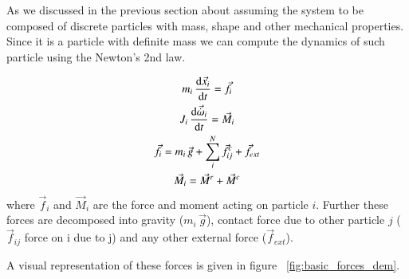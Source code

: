 As we discussed in the previous section about assuming the system to be composed
of discrete particles with mass, shape and other mechanical properties. Since it
is a particle with definite mass we can compute the dynamics of such particle
using the Newton's 2nd law.


\begin{gather}
  \label{eq:dem:equations_of_motion}
  m_i \, \dv{\vec{x}_i}{t} = \vec{f}_i\\
  J_i \, \dv{\vec{\dot{\omega}}_i}{t} = \vec{M}_i\\
  \vec{f}_i = m_i \,\vec{g} + \sum_i^N \vec{f}_{ij}^c + \vec{f}_{ext}\\
  \vec{M}_i = \vec{M}^r + \vec{M}^c
\end{gather}
where $\vec{f}_i$ and $\vec{M}_i$ are the force and moment acting on particle
$i$. Further these forces are decomposed into gravity ($m_i \, \vec{g}$),
contact force due to other particle $j$ ($\vec{f}_{ij}$ force on i due to j) and
any other external force ($\vec{f}_{ext}$).

A visual representation of these forces is given in figure
~\ref{fig:basic_forces_dem}.

